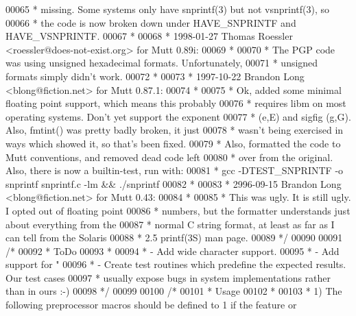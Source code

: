 \begin{DoxyCode}
00065 \textcolor{comment}{ *  missing.  Some systems only have snprintf(3) but not vsnprintf(3), so}
00066 \textcolor{comment}{ *  the code is now broken down under HAVE\_SNPRINTF and HAVE\_VSNPRINTF.}
00067 \textcolor{comment}{ *}
00068 \textcolor{comment}{ * 1998-01-27 Thomas Roessler <roessler@does-not-exist.org> for Mutt 0.89i:}
00069 \textcolor{comment}{ *}
00070 \textcolor{comment}{ *  The PGP code was using unsigned hexadecimal formats.  Unfortunately,}
00071 \textcolor{comment}{ *  unsigned formats simply didn't work.}
00072 \textcolor{comment}{ *}
00073 \textcolor{comment}{ * 1997-10-22 Brandon Long <blong@fiction.net> for Mutt 0.87.1:}
00074 \textcolor{comment}{ *}
00075 \textcolor{comment}{ *  Ok, added some minimal floating point support, which means this probably}
00076 \textcolor{comment}{ *  requires libm on most operating systems.  Don't yet support the exponent}
00077 \textcolor{comment}{ *  (e,E) and sigfig (g,G).  Also, fmtint() was pretty badly broken, it just}
00078 \textcolor{comment}{ *  wasn't being exercised in ways which showed it, so that's been fixed.}
00079 \textcolor{comment}{ *  Also, formatted the code to Mutt conventions, and removed dead code left}
00080 \textcolor{comment}{ *  over from the original.  Also, there is now a builtin-test, run with:}
00081 \textcolor{comment}{ *  gcc -DTEST\_SNPRINTF -o snprintf snprintf.c -lm && ./snprintf}
00082 \textcolor{comment}{ *}
00083 \textcolor{comment}{ * 2996-09-15 Brandon Long <blong@fiction.net> for Mutt 0.43:}
00084 \textcolor{comment}{ *}
00085 \textcolor{comment}{ *  This was ugly.  It is still ugly.  I opted out of floating point}
00086 \textcolor{comment}{ *  numbers, but the formatter understands just about everything from the}
00087 \textcolor{comment}{ *  normal C string format, at least as far as I can tell from the Solaris}
00088 \textcolor{comment}{ *  2.5 printf(3S) man page.}
00089 \textcolor{comment}{ */}
00090 
00091 \textcolor{comment}{/*}
00092 \textcolor{comment}{ * ToDo}
00093 \textcolor{comment}{ *}
00094 \textcolor{comment}{ * - Add wide character support.}
00095 \textcolor{comment}{ * - Add support for "%
00096 \textcolor{comment}{ * - Create test routines which predefine the expected results.  Our test cases}
00097 \textcolor{comment}{ *   usually expose bugs in system implementations rather than in ours :-)}
00098 \textcolor{comment}{ */}
00099 
00100 \textcolor{comment}{/*}
00101 \textcolor{comment}{ * Usage}
00102 \textcolor{comment}{ *}
00103 \textcolor{comment}{ * 1) The following preprocessor macros should be defined to 1 if the feature or}
}
\end{DoxyCode}
